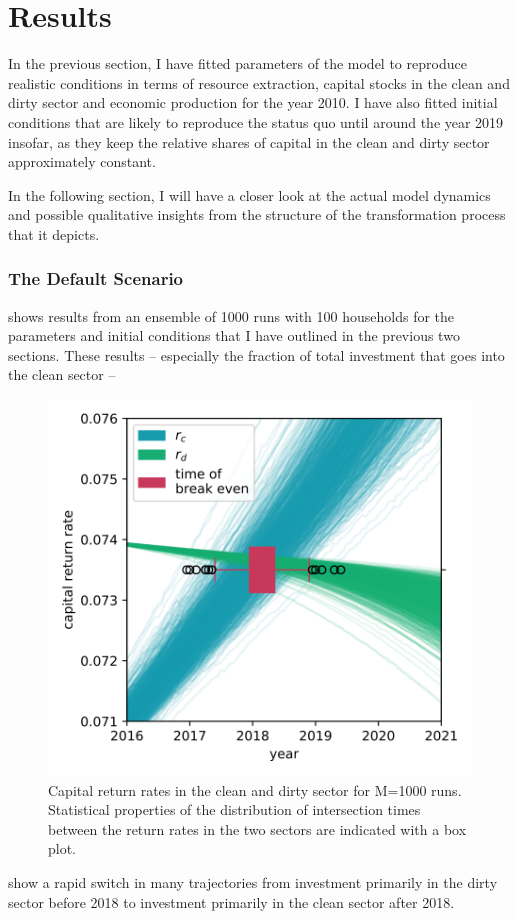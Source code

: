 \section{Results}  
In the previous section, I have fitted parameters of the model to reproduce realistic conditions in terms of resource extraction, capital stocks in the clean and dirty sector and economic production for the year 2010. I have also fitted initial conditions that are likely to reproduce the status quo until around the year 2019 insofar, as they keep the relative shares of capital in the clean and dirty sector approximately constant. 

In the following section, I will have a closer look at the actual model dynamics and possible qualitative insights from the structure of the transformation process that it depicts.

\subsubsection{The Default Scenario}
\label{sec:default_scenario}
 shows results from an ensemble of 1000 runs with 100 households for the parameters and initial conditions that I have outlined in the previous two sections. These results -- especially the fraction of total investment that goes into the clean sector -- 
\begin{figure}
	\vspace{-.1 cm}
        \hspace{-1.8 cm}
        \includegraphics[width = .64 \textwidth]{./figures/break_even.png}
        \caption[Capital return rates in the clean and dirty sector for N=1000 runs]{Capital return rates in the clean and dirty sector for M=1000 runs. Statistical properties of the distribution of intersection times between the return rates in the two sectors are indicated with a box plot.\label{fig:break_even}}
\end{figure}
show a rapid switch in many trajectories from investment primarily in the dirty sector before 2018 to investment primarily in the clean sector after 2018. 

